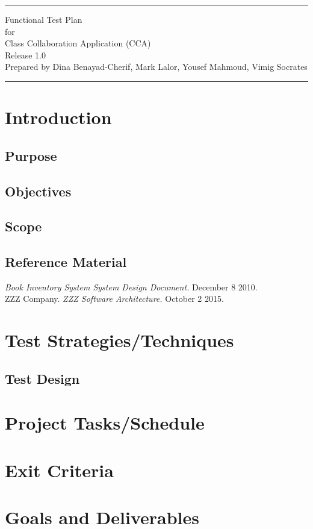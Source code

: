\documentclass{scrreprt}
\date{}
\def\myversion{1.0}
\begin{document}
\begin{flushright}
	\rule{16cm}{5pt}\vskip1cm
	\Huge{Functional Test Plan}\\
	\vspace{2cm}
	for\\
	\vspace{2cm}
	Class Collaboration Application (CCA)\\
	\vspace{2cm}
	\LARGE{Release \myversion \\}
	\vspace{2cm}
	Prepared by Dina Benayad-Cherif, Mark Lalor, Yousef Mahmoud, Vimig Socrates\\
	\vfill
	\rule{16cm}{5pt}
\end{flushright}

\tableofcontents


\chapter{Introduction}

\section{Purpose}

\section{Objectives}


\section{Scope}


\section{Reference Material}
\textit{Book Inventory System System Design Document.} December 8 2010. \\
ZZZ Company. \textit{ZZZ Software Architecture.} October 2 2015. 


\chapter{Test Strategies/Techniques}
	
\section{Test Design}


\chapter{Project Tasks/Schedule}

\chapter{Exit Criteria}

\chapter{Goals and Deliverables}
\end{document}

